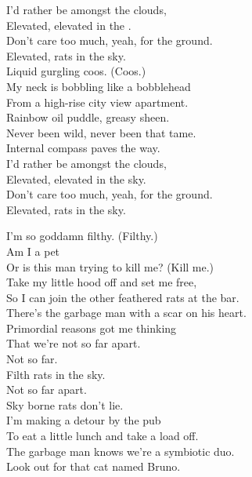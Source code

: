 


I'd rather be amongst the clouds, \\
Elevated, elevated in the . \\
Don't care too much, yeah, for the ground. \\
Elevated, rats in the sky. \\

Liquid gurgling coos. (Coos.) \\
My neck is bobbling like a bobblehead \\
From a high-rise city view apartment. \\
Rainbow oil puddle, greasy sheen. \\
Never been wild, never been that tame. \\
Internal compass paves the way. \\

I'd rather be amongst the clouds, \\
Elevated, elevated in the sky. \\
Don't care too much, yeah, for the ground. \\
Elevated, rats in the sky. \\


I'm so goddamn filthy. (Filthy.) \\
Am I a pet \\
Or is this man trying to kill me? (Kill me.) \\

Take my little hood off and set me free, \\
So I can join the other feathered rats at the bar. \\
There's the garbage man with a scar on his heart. \\
Primordial reasons got me thinking \\
That we're not so far apart. \\

Not so far. \\
Filth rats in the sky. \\
Not so far apart. \\
Sky borne rats don't lie. \\

I'm making a detour by the pub \\
To eat a little lunch and take a load off. \\
The garbage man knows we're a symbiotic duo. \\
Look out for that cat named Bruno. \\

